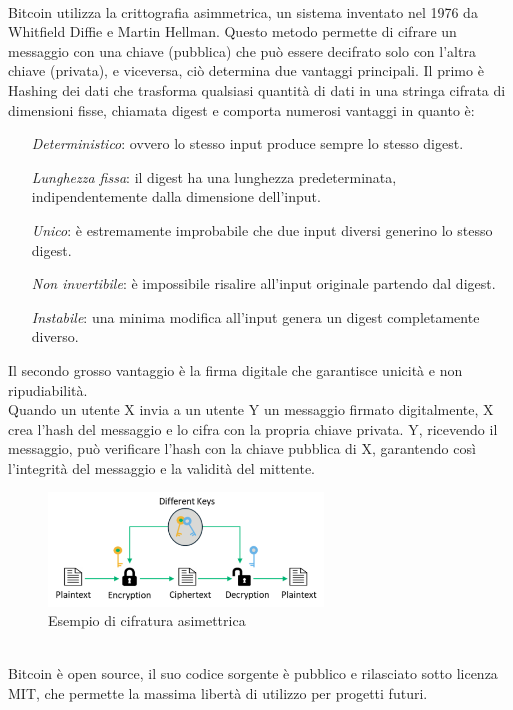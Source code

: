 \\Bitcoin utilizza la crittografia asimmetrica, un sistema inventato nel 1976 da Whitfield Diffie e Martin Hellman. Questo metodo permette di cifrare un messaggio con una chiave (pubblica) che può essere decifrato solo con l’altra chiave (privata), e viceversa, ciò determina due vantaggi principali.
Il primo è Hashing dei dati che trasforma qualsiasi quantità di dati in una stringa cifrata di dimensioni fisse, chiamata digest e comporta numerosi vantaggi in quanto è: 
\begin{itemize}
    \item[\textit{Deterministico}:] ovvero lo stesso input produce sempre lo stesso digest.
    \item [\textit{Lunghezza fissa}:] il digest ha una lunghezza predeterminata, indipendentemente dalla dimensione dell’input.
    \item [\textit{Unico}:] è estremamente improbabile che due input diversi generino lo stesso digest.
    \item [\textit{Non invertibile}:] è impossibile risalire all’input originale partendo dal digest.
    \item [\textit{Instabile}:] una minima modifica all’input genera un digest completamente diverso.
\end{itemize}
Il secondo grosso vantaggio è la firma digitale che garantisce unicità e non ripudiabilità. 
\\Quando un utente X invia a un utente Y un messaggio firmato digitalmente, X crea l’hash del messaggio e lo cifra con la propria chiave privata. Y, ricevendo il messaggio, può verificare l’hash con la chiave pubblica di X, garantendo così l’integrità del messaggio e la validità del mittente.
\begin{figure}[h]
\centering
\includegraphics[width=0.65\textwidth]{Immagini/cifratura asimmetrica.png}
\caption{Esempio di cifratura asimettrica}
\end{figure}
\\
Bitcoin è open source, il suo codice sorgente è pubblico e rilasciato sotto licenza MIT, che permette la massima libertà di utilizzo per progetti futuri.
